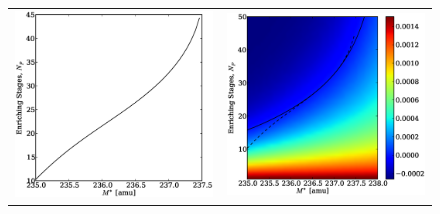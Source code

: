 \documentclass[preprint,12pt]{elsarticle}
\begin{document}
\begin{figure}[htpb]
\begin{center}
\begin{tabular}{cc}
\includegraphics[scale=0.375]{np_closed.eps} & 
                                \includegraphics[scale=0.375]{np_closed_overlay.eps} \\

\end{tabular}
\end{center}
\end{figure}
\end{document}
